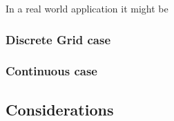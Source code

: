 In a real world application it might be 


\subsubsection{Discrete Grid case}



\subsubsection{Continuous case}


\subsection{Considerations}